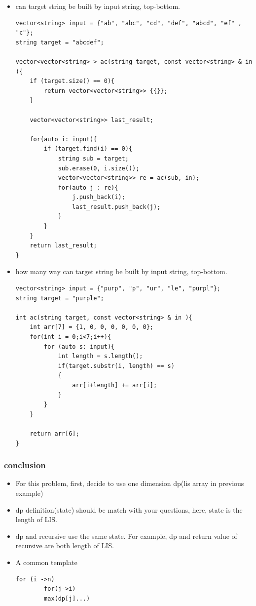 \documentclass[a4paper,11pt,twoside]{book}
\begin{document}
\begin{itemize}
	\item can target string be built by input string, top-bottom.

\begin{lstlisting}[numbers=none]
vector<string> input = {"ab", "abc", "cd", "def", "abcd", "ef" , "c"};
string target = "abcdef";

vector<vector<string> > ac(string target, const vector<string> & in ){
	if (target.size() == 0){
		return vector<vector<string>> {{}};
	}
	
	vector<vector<string>> last_result;
	
	for(auto i: input){
		if (target.find(i) == 0){
			string sub = target;
			sub.erase(0, i.size());
			vector<vector<string>> re = ac(sub, in);
			for(auto j : re){
				j.push_back(i);
				last_result.push_back(j);
			}
		}
	}
	return last_result;
}
\end{lstlisting} 

\item how many way can target string be built by input string, top-bottom.
\begin{lstlisting}[numbers=none]
vector<string> input = {"purp", "p", "ur", "le", "purpl"};
string target = "purple";

int ac(string target, const vector<string> & in ){	
	int arr[7] = {1, 0, 0, 0, 0, 0, 0};
	for(int i = 0;i<7;i++){
		for (auto s: input){
			int length = s.length();
			if(target.substr(i, length) == s)
			{
				arr[i+length] += arr[i];
			}		
		}
	}

	return arr[6];
}
\end{lstlisting} 

\end{itemize}

\subsubsection{conclusion}
\begin{itemize}
	\item For this problem, first, decide to use one dimension dp(lis array in previous example)
	\item dp definition(state) should be match with your questions, here, state is the length of LIS. 
	\item dp and recursive use the same state. For example, dp and return value of recursive are both length of LIS.
	\item A common template
	\begin{lstlisting}[numbers=none]
		for (i ->n)
		for(j->i)
		max(dp[j]...)
	\end{lstlisting}

\end{itemize}
\end{document}
